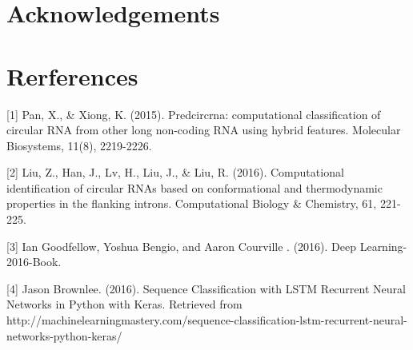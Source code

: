 \documentclass[10pt,a4paper]{article}
\begin{document}
\begin{spacing}{1.5}
\section*{Acknowledgements}

\newpage

\section*{Rerferences}

[1] Pan, X., \& Xiong, K. (2015). Predcircrna: computational classification of circular RNA from other long non-coding RNA using hybrid features. Molecular Biosystems, 11(8), 2219-2226.

[2] Liu, Z., Han, J., Lv, H., Liu, J., \& Liu, R. (2016). Computational identification of circular RNAs based on conformational and thermodynamic properties in the flanking introns. Computational Biology \& Chemistry, 61, 221-225.

[3] Ian Goodfellow, Yoshua Bengio, and Aaron Courville . (2016). Deep Learning-2016-Book.

[4] Jason Brownlee. (2016). Sequence Classification with LSTM Recurrent Neural Networks in Python with Keras. Retrieved from http://machinelearningmastery.com/sequence-classification-lstm-recurrent-neural-networks-python-keras/

\end{spacing}
\end{document}
